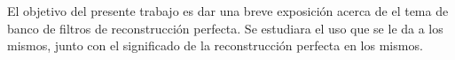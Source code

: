 El objetivo del presente trabajo es dar una breve exposición acerca de el tema de banco de filtros de reconstrucción perfecta. Se estudiara el uso que se le da a los mismos, junto con el significado de la reconstrucción perfecta en los mismos.
